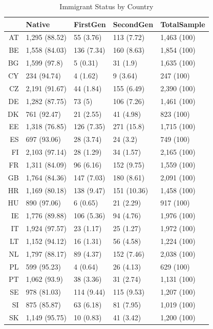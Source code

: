 \begin{table}[ht]
\centering
\begin{tabular}{rllll}
  \hline
 & Native & FirstGen & SecondGen & TotalSample \\ 
  \hline
AT & 1,295 (88.52) &  55 (3.76) & 113 (7.72) & 1,463 (100) \\ 
  BE & 1,558 (84.03) & 136 (7.34) & 160 (8.63) & 1,854 (100) \\ 
  BG & 1,599 (97.8) &   5 (0.31) &  31 (1.9) & 1,635 (100) \\ 
  CY &   234 (94.74) &   4 (1.62) &   9 (3.64) &   247 (100) \\ 
  CZ & 2,191 (91.67) &  44 (1.84) & 155 (6.49) & 2,390 (100) \\ 
  DE & 1,282 (87.75) &  73 (5) & 106 (7.26) & 1,461 (100) \\ 
  DK &   761 (92.47) &  21 (2.55) &  41 (4.98) &   823 (100) \\ 
  EE & 1,318 (76.85) & 126 (7.35) & 271 (15.8) & 1,715 (100) \\ 
  ES &   697 (93.06) &  28 (3.74) &  24 (3.2) &   749 (100) \\ 
  FI & 2,103 (97.14) &  28 (1.29) &  34 (1.57) & 2,165 (100) \\ 
  FR & 1,311 (84.09) &  96 (6.16) & 152 (9.75) & 1,559 (100) \\ 
  GB & 1,764 (84.36) & 147 (7.03) & 180 (8.61) & 2,091 (100) \\ 
  HR & 1,169 (80.18) & 138 (9.47) & 151 (10.36) & 1,458 (100) \\ 
  HU &   890 (97.06) &   6 (0.65) &  21 (2.29) &   917 (100) \\ 
  IE & 1,776 (89.88) & 106 (5.36) &  94 (4.76) & 1,976 (100) \\ 
  IT & 1,924 (97.57) &  23 (1.17) &  25 (1.27) & 1,972 (100) \\ 
  LT & 1,152 (94.12) &  16 (1.31) &  56 (4.58) & 1,224 (100) \\ 
  NL & 1,797 (88.17) &  89 (4.37) & 152 (7.46) & 2,038 (100) \\ 
  PL &   599 (95.23) &   4 (0.64) &  26 (4.13) &   629 (100) \\ 
  PT & 1,062 (93.9) &  38 (3.36) &  31 (2.74) & 1,131 (100) \\ 
  SE &   978 (81.03) & 114 (9.44) & 115 (9.53) & 1,207 (100) \\ 
  SI &   875 (85.87) &  63 (6.18) &  81 (7.95) & 1,019 (100) \\ 
  SK & 1,149 (95.75) &  10 (0.83) &  41 (3.42) & 1,200 (100) \\ 
   \hline
\end{tabular}
\caption{Immigrant Status by Country} 
\end{table}
